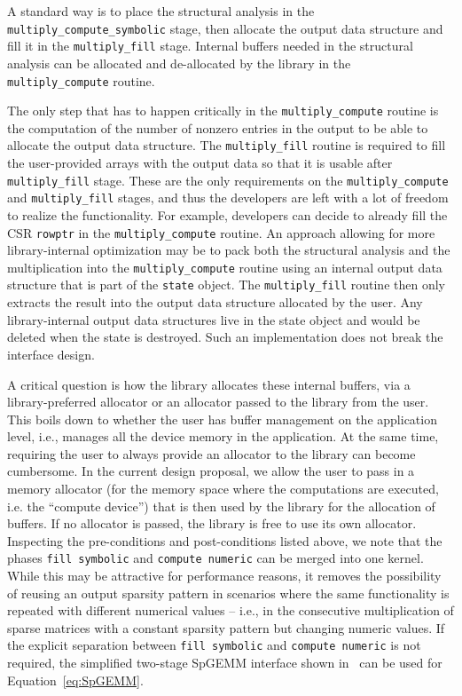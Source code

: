 \documentclass[manuscript,review]{acmart}
\begin{document}
A standard way is to place the structural analysis in the \texttt{multiply\_compute\_symbolic} stage, then allocate the output data structure and fill it in the \texttt{multiply\_fill} stage. Internal buffers needed in the structural analysis can be allocated and de-allocated by the library in the \texttt{multiply\_compute} routine. 

The only step that has to happen critically in the \texttt{multiply\_compute} routine is the computation of the number of nonzero entries in the output to be able to allocate the output data structure. The \texttt{multiply\_fill} routine is required to fill the user-provided arrays with the output data so that it is usable after \texttt{multiply\_fill} stage. These are the only requirements on the \texttt{multiply\_compute} and \texttt{multiply\_fill} stages, and thus the developers are left with a lot of freedom to realize the functionality. For example, developers can decide to already fill the CSR \texttt{rowptr} in the \texttt{multiply\_compute} routine. An approach allowing for more library-internal optimization may be to pack both the structural analysis and the multiplication into the \texttt{multiply\_compute} routine using an internal output data structure that is part of the \texttt{state} object. The \texttt{multiply\_fill} routine then only extracts the result into the output data structure allocated by the user. Any library-internal output data structures live in the state object and would be deleted when the state is destroyed. Such an implementation does not break the interface design.

A critical question is how the library allocates these internal buffers, via a library-preferred allocator or an allocator passed to the library from the user. This boils down to whether the user has buffer management on the application level, i.e., manages all the device memory in the application. At the same time, requiring the user to always provide an allocator to the library can become cumbersome. In the current design proposal, we allow the user to pass in a memory allocator (for the memory space where the computations are executed, i.e. the ``compute device'') that is then used by the library for the allocation of buffers. If no allocator is passed, the library is free to use its own allocator.\\

Inspecting the pre-conditions and post-conditions listed above, we note that the phases \texttt{fill symbolic} and \texttt{compute numeric} can be merged into one kernel. While this may be attractive for performance reasons, it removes the possibility of reusing an output sparsity pattern in scenarios where the same functionality is repeated with different numerical values -- i.e., in the consecutive multiplication of sparse matrices with a constant sparsity pattern but changing numeric values. If the explicit separation between \texttt{fill symbolic} and \texttt{compute numeric} is not required, %
the simplified two-stage SpGEMM interface shown in~ can be used for Equation~\eqref{eq:SpGEMM}.
\end{document}
